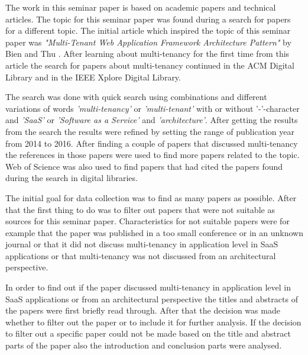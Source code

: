 \documentclass[conference]{sasmoota2017}
\begin{document}
The work in this seminar paper is based on academic papers and technical articles. The topic for this seminar paper was found during a search for papers for a different topic. The initial article which inspired the topic of this seminar paper was \textit{"Multi-Tenant Web Application Framework Architecture Pattern"} by Bien and Thu \cite{Bien:2015:MultiTenantWebApp}. After learning about multi-tenancy for the first time from this article the search for papers about multi-tenancy continued in the ACM Digital Library and in the IEEE Xplore Digital Library. 

The search was done with quick search using combinations and different variations of words \textit{'multi-tenancy'} or \textit{'multi-tenant'} with or without '-'-character and \textit{'SaaS'} or \textit{'Software as a Service'} and \textit{'architecture'}. After getting the results from the search the results were refined by setting the range of publication year from 2014 to 2016. After finding a couple of papers that discussed multi-tenancy the references in those papers were used to find more papers related to the topic. Web of Science was also used to find papers that had cited the papers found during the search in digital libraries.

The initial goal for data collection was to find as many papers as possible. After that the first thing to do was to filter out papers that were not suitable as sources for this seminar paper. Characteristics for not suitable papers were for example that the paper was published in a too small conference or in an unknown journal or that it did not discuss multi-tenancy in application level in SaaS applications or that multi-tenancy was not discussed from an architectural perspective. 

In order to find out if the paper discussed multi-tenancy in application level in SaaS applications or from an architectural perspective the titles and abstracts of the papers were first briefly read through. After that the decision was made whether to filter out the paper or to include it for further analysis. If the decision to filter out a specific paper could not be made based on the title and abstract parts of the paper also the introduction and conclusion parts were analysed. 
\end{document}
